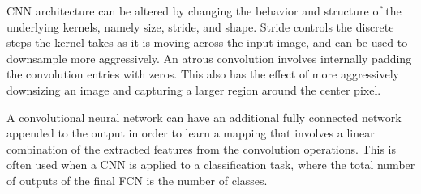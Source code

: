 CNN architecture can be altered by changing the behavior and structure of the underlying kernels, namely size, stride, and shape. Stride controls the discrete steps the kernel takes as it is moving across the input image, and can be used to downsample more aggressively. An atrous convolution involves internally padding the convolution entries with zeros. This also has the effect of more aggressively downsizing an image and capturing a larger region around the center pixel.

A convolutional neural network can have an additional fully connected network appended to the output in order to learn a mapping that involves a linear combination of the extracted features from the convolution operations. This is often used when a CNN is applied to a classification task, where the total number of outputs of the final FCN is the number of classes.
